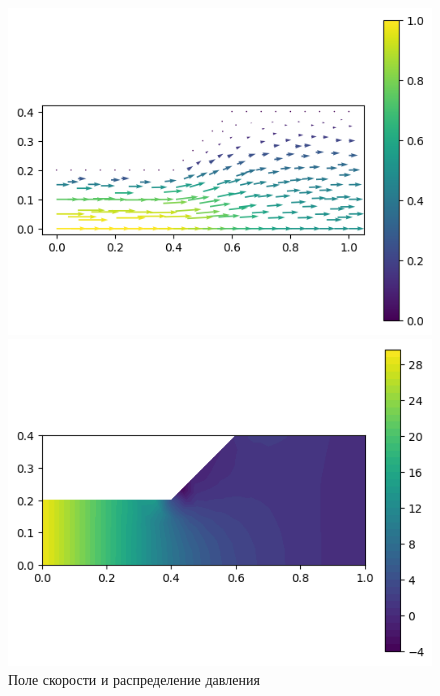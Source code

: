 \documentclass[a4paper,10pt]{report}
\begin{document}
\begin{figure}[H]
    \begin{minipage}{0.49\linewidth}
        \includegraphics[height=0.75\linewidth]{channelflow/u.png}
    \end{minipage}
    \begin{minipage}{0.49\linewidth}
        \includegraphics[height=0.75\linewidth]{channelflow/p.png}
    \end{minipage}
    \label{fig:channelflow}
    \caption{Поле скорости и распределение давления}
\end{figure}
 

%
%
\end{document}
